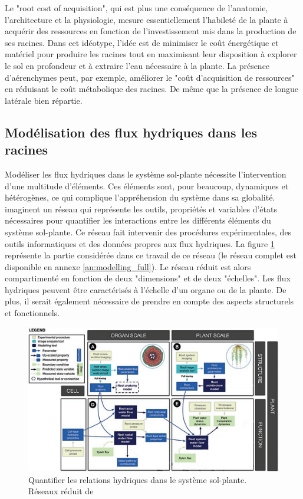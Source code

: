 Le "root cost of acquisition", qui est plus une conséquence de l'anatomie, l'architecture et la physiologie, mesure essentiellement l'habileté de la plante à acquérir des ressources en fonction de l'investissement mis dans la production de ses racines.
Dans cet idéotype, l'idée est de minimiser le coût énergétique et matériel pour produire les racines tout en maximisant leur disposition à explorer le sol en profondeur et à extraire l'eau nécessaire à la plante.
La présence d'aérenchymes peut, par exemple, améliorer le "coût d'acquisition de ressources" en réduisant le coût métabolique des racines.
De même que la présence de longue latérale bien répartie.
\newline

\subsection{Modélisation des flux hydriques dans les racines}

Modéliser les flux hydriques dans le système sol-plante nécessite l'intervention d'une multitude d'éléments.
Ces éléments sont, pour beaucoup, dynamiques et hétérogènes, ce qui complique l'appréhension du système dans sa globalité.
\cite{passot_connecting_2018} imaginent un réseau qui représente les outils, propriétés et variables d'états nécessaires pour quantifier les interactions entre les différents éléments du système sol-plante.
Ce réseau fait intervenir des procédures expérimentales, des outils informatiques et des données propres aux flux hydriques.
La figure \ref{fig:modelling} représente la partie considérée dans ce travail de ce réseau (le réseau complet est disponible en annexe \ref{an:modelling_full}).
Le réseau réduit est alors compartimenté en fonction de deux "dimensions" et de deux "échelles".
Les flux hydriques peuvent être caractérisés à l'échelle d'un organe ou de la plante.
De plus, il serait également nécessaire de prendre en compte des aspects structurels et fonctionnels.
\newpage

\begin{figure}[ht]
\centering
\includegraphics[width=1\textwidth]{Image/modelling_b.png}
\caption{Quantifier les relations hydriques dans le système sol-plante. Réseaux réduit de \cite{passot_connecting_2018}}
\label{fig:modelling}
\end{figure}


